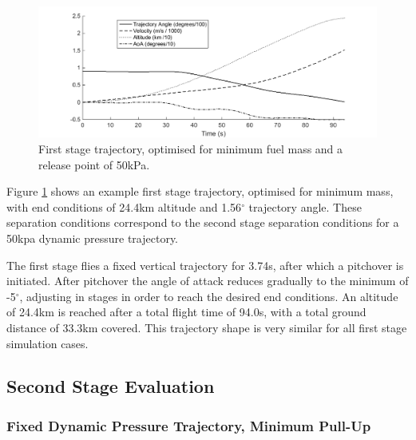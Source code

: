 \documentclass[journal]{new-aiaa}
\begin{document}
\begin{figure}[H]
	\centering
	\includegraphics[width=.9\linewidth]{FirstStage}
	\caption{First stage trajectory, optimised for minimum fuel mass and a release point of 50kPa.}
	\label{fig:FirstStage}
\end{figure}

Figure \ref{fig:FirstStage} shows an example first stage trajectory, optimised for minimum mass, with end conditions of 24.4km altitude and 1.56$^\circ$ trajectory angle. These separation conditions correspond to the second stage separation conditions for a 50kpa dynamic pressure trajectory. 

The first stage flies a fixed vertical trajectory for 3.74s, after which a pitchover is initiated. 
After pitchover the angle of attack reduces gradually to the minimum of -5$^\circ$, adjusting in stages in order to reach the desired end conditions. 
An altitude of 24.4km is reached after a total flight time of 94.0s, with a total ground distance of 33.3km covered. 
This trajectory shape is very similar for all first stage simulation cases. 



\subsection{Second Stage Evaluation}
\subsubsection{Fixed Dynamic Pressure Trajectory, Minimum Pull-Up} \label{subsection:Fixed}
\end{document}
